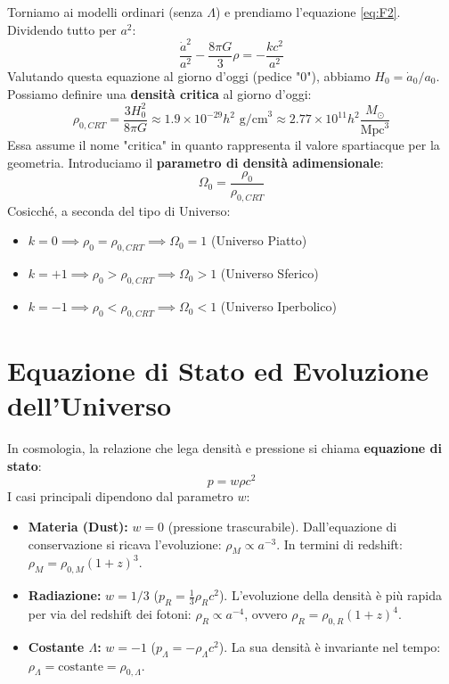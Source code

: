 \documentclass[11pt,a4paper]{report}
\begin{document}
Torniamo ai modelli ordinari (senza $\Lambda$) e prendiamo l'equazione \eqref{eq:F2}. Dividendo tutto per $a^2$:
\begin{equation}
\frac{\dot{a}^2}{a^2} - \frac{8\pi G}{3}\rho = -\frac{kc^2}{a^2}
\end{equation}
Valutando questa equazione al giorno d'oggi (pedice "0"), abbiamo $H_0 = \dot{a}_0/a_0$. Possiamo definire una \textbf{densità critica} al giorno d'oggi:
\begin{equation}
\rho_{0, CRT} = \frac{3H_0^2}{8\pi G} \approx 1.9 \times 10^{-29} h^2 \text{ g/cm}^3 \approx 2.77 \times 10^{11} h^2 \frac{M_\odot}{\text{Mpc}^3}
\end{equation}
Essa assume il nome "critica" in quanto rappresenta il valore spartiacque per la geometria. Introduciamo il \textbf{parametro di densità adimensionale}:
\begin{equation}
\Omega_0 = \frac{\rho_0}{\rho_{0, CRT}}
\end{equation}
Cosicché, a seconda del tipo di Universo:
\begin{itemize}
    \item $k = 0 \implies \rho_0 = \rho_{0, CRT} \implies \Omega_0 = 1$ (Universo Piatto)
    \item $k = +1 \implies \rho_0 > \rho_{0, CRT} \implies \Omega_0 > 1$ (Universo Sferico)
    \item $k = -1 \implies \rho_0 < \rho_{0, CRT} \implies \Omega_0 < 1$ (Universo Iperbolico)
\end{itemize}

\section{Equazione di Stato ed Evoluzione dell'Universo}

In cosmologia, la relazione che lega densità e pressione si chiama \textbf{equazione di stato}:
\begin{equation}
p = w \rho c^2
\end{equation}
I casi principali dipendono dal parametro $w$:
\begin{itemize}
    \item \textbf{Materia (Dust):} $w = 0$ (pressione trascurabile). Dall'equazione di conservazione si ricava l'evoluzione: $\rho_M \propto a^{-3}$. In termini di redshift: $\rho_M = \rho_{0,M} (1+z)^3$.
    \item \textbf{Radiazione:} $w = 1/3$ ($p_R = \frac{1}{3}\rho_R c^2$). L'evoluzione della densità è più rapida per via del redshift dei fotoni: $\rho_R \propto a^{-4}$, ovvero $\rho_R = \rho_{0,R} (1+z)^4$.
    \item \textbf{Costante $\Lambda$:} $w = -1$ ($p_\Lambda = -\rho_\Lambda c^2$). La sua densità è invariante nel tempo: $\rho_\Lambda = \text{costante} = \rho_{0,\Lambda}$.
\end{itemize}
\end{document}
